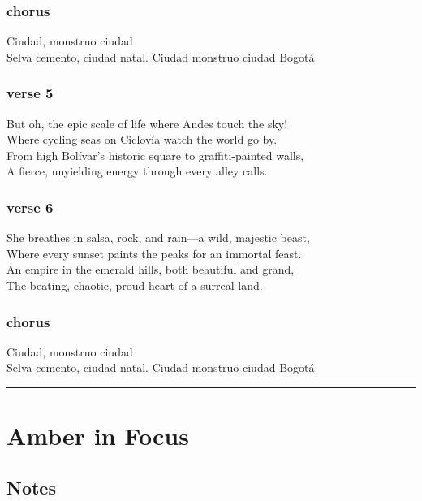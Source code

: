 \subsubsection{chorus}\label{chorus-16}

Ciudad, monstruo ciudad\\
Selva cemento, ciudad natal. Ciudad monstruo ciudad Bogotá

\subsubsection{verse 5}\label{verse-5}

But oh, the epic scale of life where Andes touch the sky!\\
Where cycling seas on Ciclovía watch the world go by.\\
From high Bolívar's historic square to graffiti-painted walls,\\
A fierce, unyielding energy through every alley calls.

\subsubsection{verse 6}\label{verse-6}

She breathes in salsa, rock, and rain---a wild, majestic beast,\\
Where every sunset paints the peaks for an immortal feast.\\
An empire in the emerald hills, both beautiful and grand,\\
The beating, chaotic, proud heart of a surreal land.

\subsubsection{chorus}\label{chorus-17}

Ciudad, monstruo ciudad\\
Selva cemento, ciudad natal. Ciudad monstruo ciudad Bogotá

\begin{center}\rule{0.5\linewidth}{0.5pt}\end{center}

\section{Amber in Focus}\label{amber-in-focus}

\subsection{Notes}\label{notes-15}

